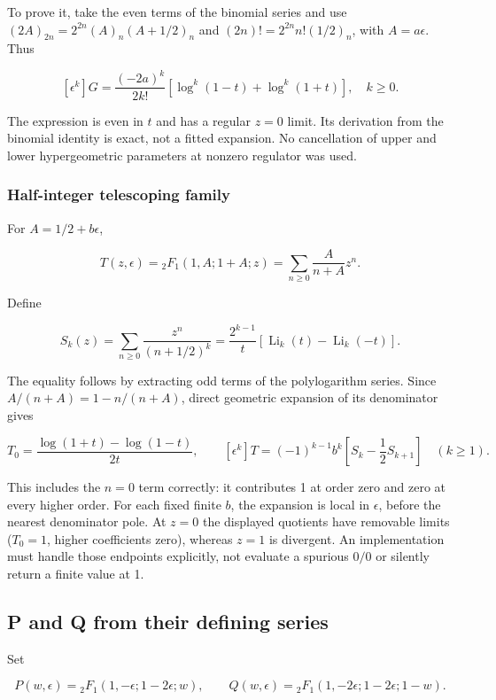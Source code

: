 \documentclass[
  11pt,
]{article}
\begin{document}
To prove it, take the even terms of the binomial series and use
\((2A)_{2n}=2^{2n}(A)_n(A+1/2)_n\) and \((2n)!=2^{2n}n!(1/2)_n\), with
\(A=a\epsilon\). Thus

\[[\epsilon^k]G=\frac{(-2a)^k}{2k!}
\left[\log^k(1-t)+\log^k(1+t)\right],\quad k\geq0.\]

The expression is even in \(t\) and has a regular \(z=0\) limit. Its
derivation from the binomial identity is exact, not a fitted expansion.
No cancellation of upper and lower hypergeometric parameters at nonzero
regulator was used.

\subsubsection{Half-integer telescoping
family}\label{half-integer-telescoping-family}

For \(A=1/2+b\epsilon\),

\[T(z,\epsilon)={}_2F_1(1,A;1+A;z)
=\sum_{n\geq0}\frac{A}{n+A}z^n.\]

Define

\[S_k(z)=\sum_{n\geq0}\frac{z^n}{(n+1/2)^k}
=\frac{2^{k-1}}t\left[\operatorname{Li}_k(t)-\operatorname{Li}_k(-t)\right].\]

The equality follows by extracting odd terms of the polylogarithm
series. Since \(A/(n+A)=1-n/(n+A)\), direct geometric expansion of its
denominator gives

\[T_0=\frac{\log(1+t)-\log(1-t)}{2t},\qquad
[\epsilon^k]T=(-1)^{k-1}b^k
\left[S_k-\frac12S_{k+1}\right]\quad(k\geq1).\]

This includes the \(n=0\) term correctly: it contributes 1 at order zero
and zero at every higher order. For each fixed finite \(b\), the
expansion is local in \(\epsilon\), before the nearest denominator pole.
At \(z=0\) the displayed quotients have removable limits (\(T_0=1\),
higher coefficients zero), whereas \(z=1\) is divergent. An
implementation must handle those endpoints explicitly, not evaluate a
spurious \(0/0\) or silently return a finite value at 1.

\subsection{P and Q from their defining
series}\label{p-and-q-from-their-defining-series}

Set

\[P(w,\epsilon)={}_2F_1(1,-\epsilon;1-2\epsilon;w),\qquad
Q(w,\epsilon)={}_2F_1(1,-2\epsilon;1-2\epsilon;1-w).\]
\end{document}
